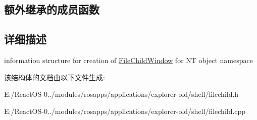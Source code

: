 \subsection*{额外继承的成员函数}


\subsection{详细描述}
information structure for creation of \hyperlink{struct_file_child_window}{File\+Child\+Window} for NT object namespace 

该结构体的文档由以下文件生成\+:\begin{DoxyCompactItemize}
\item 
E\+:/\+React\+O\+S-\/0../modules/rosapps/applications/explorer-\/old/shell/filechild.\+h\item 
E\+:/\+React\+O\+S-\/0../modules/rosapps/applications/explorer-\/old/shell/filechild.\+cpp\end{DoxyCompactItemize}
